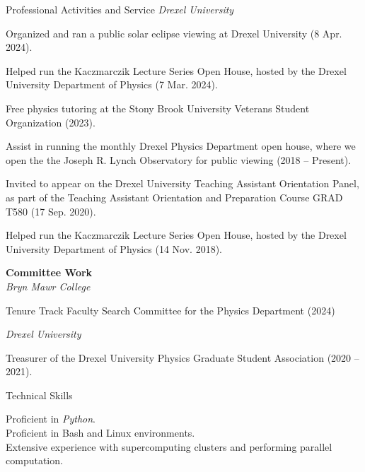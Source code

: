 \documentclass{resume} %
\begin{document}
\begin{rSection}{Professional Activities and Service}
\textit{Drexel University}
\begin{description}[leftmargin=2em, style=nextline]
\vspace{-0.5em}
\item[~] Organized and ran a public solar eclipse viewing at Drexel University (8 Apr. 2024).
\item[~]Helped run the Kaczmarczik Lecture Series Open House, hosted by the Drexel University Department of Physics (7 Mar. 2024).
\item[~]Free physics tutoring at the Stony Brook University Veterans Student Organization (2023).
\item[~]Assist in running the monthly Drexel Physics Department open house, where we open the the Joseph R. Lynch Observatory for public viewing (2018 -- Present).
\item[~]Invited to appear on the Drexel University Teaching Assistant Orientation Panel, as part of the Teaching Assistant Orientation and Preparation Course GRAD T580 (17 Sep. 2020).
\item[~]Helped run the Kaczmarczik Lecture Series Open House, hosted by the Drexel University Department of Physics (14 Nov. 2018).
\end{description}

\textbf{Committee Work}\\
\textit{Bryn Mawr College}
\begin{description}[leftmargin=2em, style=nextline]
\vspace{-0.5em}
\item[~] Tenure Track Faculty Search Committee for the Physics Department (2024)
\end{description}

\textit{Drexel University}
\begin{description}[leftmargin=2em, style=nextline]
\vspace{-0.5em}
\item[~] Treasurer of the Drexel University Physics Graduate Student Association (2020 -- 2021).
\end{description}


\end{rSection}



\begin{rSection}{Technical Skills}

Proficient in \textit{Python}.\\
Proficient in Bash and Linux environments.\\
Extensive experience with supercomputing clusters and performing parallel computation.

\end{rSection}
\end{document}

